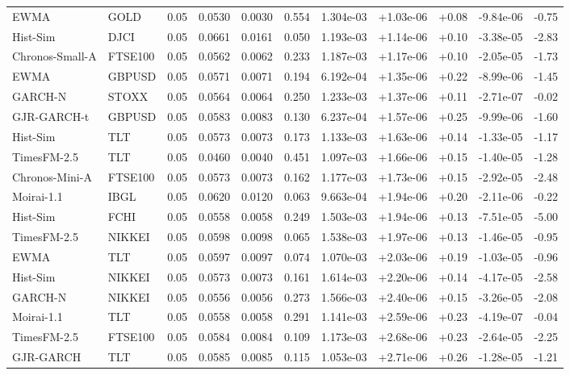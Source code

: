 \begin{tabular}{llrrrrrrrrr}
EWMA & GOLD & 0.05 & 0.0530 & 0.0030 & 0.554 & 1.304e-03 & +1.03e-06 & +0.08 & -9.84e-06 & -0.75 \\
Hist-Sim & DJCI & 0.05 & 0.0661 & 0.0161 & 0.050 & 1.193e-03 & +1.14e-06 & +0.10 & -3.38e-05 & -2.83 \\
Chronos-Small-A & FTSE100 & 0.05 & 0.0562 & 0.0062 & 0.233 & 1.187e-03 & +1.17e-06 & +0.10 & -2.05e-05 & -1.73 \\
EWMA & GBPUSD & 0.05 & 0.0571 & 0.0071 & 0.194 & 6.192e-04 & +1.35e-06 & +0.22 & -8.99e-06 & -1.45 \\
GARCH-N & STOXX & 0.05 & 0.0564 & 0.0064 & 0.250 & 1.233e-03 & +1.37e-06 & +0.11 & -2.71e-07 & -0.02 \\
GJR-GARCH-t & GBPUSD & 0.05 & 0.0583 & 0.0083 & 0.130 & 6.237e-04 & +1.57e-06 & +0.25 & -9.99e-06 & -1.60 \\
Hist-Sim & TLT & 0.05 & 0.0573 & 0.0073 & 0.173 & 1.133e-03 & +1.63e-06 & +0.14 & -1.33e-05 & -1.17 \\
TimesFM-2.5 & TLT & 0.05 & 0.0460 & 0.0040 & 0.451 & 1.097e-03 & +1.66e-06 & +0.15 & -1.40e-05 & -1.28 \\
Chronos-Mini-A & FTSE100 & 0.05 & 0.0573 & 0.0073 & 0.162 & 1.177e-03 & +1.73e-06 & +0.15 & -2.92e-05 & -2.48 \\
Moirai-1.1 & IBGL & 0.05 & 0.0620 & 0.0120 & 0.063 & 9.663e-04 & +1.94e-06 & +0.20 & -2.11e-06 & -0.22 \\
Hist-Sim & FCHI & 0.05 & 0.0558 & 0.0058 & 0.249 & 1.503e-03 & +1.94e-06 & +0.13 & -7.51e-05 & -5.00 \\
TimesFM-2.5 & NIKKEI & 0.05 & 0.0598 & 0.0098 & 0.065 & 1.538e-03 & +1.97e-06 & +0.13 & -1.46e-05 & -0.95 \\
EWMA & TLT & 0.05 & 0.0597 & 0.0097 & 0.074 & 1.070e-03 & +2.03e-06 & +0.19 & -1.03e-05 & -0.96 \\
Hist-Sim & NIKKEI & 0.05 & 0.0573 & 0.0073 & 0.161 & 1.614e-03 & +2.20e-06 & +0.14 & -4.17e-05 & -2.58 \\
GARCH-N & NIKKEI & 0.05 & 0.0556 & 0.0056 & 0.273 & 1.566e-03 & +2.40e-06 & +0.15 & -3.26e-05 & -2.08 \\
Moirai-1.1 & TLT & 0.05 & 0.0558 & 0.0058 & 0.291 & 1.141e-03 & +2.59e-06 & +0.23 & -4.19e-07 & -0.04 \\
TimesFM-2.5 & FTSE100 & 0.05 & 0.0584 & 0.0084 & 0.109 & 1.173e-03 & +2.68e-06 & +0.23 & -2.64e-05 & -2.25 \\
GJR-GARCH & TLT & 0.05 & 0.0585 & 0.0085 & 0.115 & 1.053e-03 & +2.71e-06 & +0.26 & -1.28e-05 & -1.21 \\

\end{tabular}
